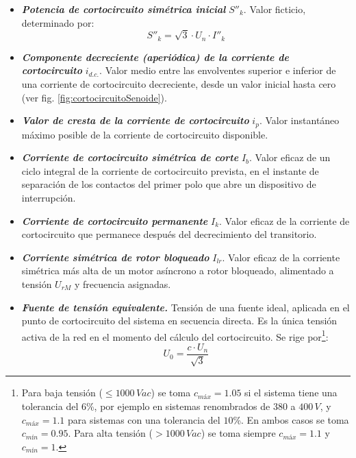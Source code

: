 \begin{itemize}
            \item \textbf{\textit{Potencia de cortocircuito simétrica inicial}} $S''_k$. Valor ficticio, determinado por:
            \begin{equation}
                S''_k = \sqrt{3}\cdot U_\textit{n} \cdot I''_k
            \end{equation}
            \item \textbf{\textit{Componente decreciente (aperiódica) de la corriente de cortocircuito}} $i_\textit{d.c.}$. Valor medio entre las envolventes superior e inferior de una corriente de cortocircuito decreciente, desde un valor inicial hasta cero (ver fig. \ref{fig:cortocircuitoSenoide}). 
            \item \textbf{\textit{Valor de cresta de la corriente de cortocircuito}} $i_\textit{p}$. Valor instantáneo máximo posible de la corriente de cortocircuito disponible.
            \item \textbf{\textit{Corriente de cortocircuito simétrica de corte}} $I_\textit{b}$. Valor eficaz de un ciclo integral de la corriente de cortocircuito prevista, en el instante de separación de los contactos del primer polo que abre un dispositivo de interrupción. 
            \item \textbf{\textit{Corriente de cortocircuito permanente}} $I_\textit{k}$. Valor eficaz de la corriente de cortocircuito que permanece después del decrecimiento del transitorio. 
            \item \textbf{\textit{Corriente simétrica de rotor bloqueado}} $I_\textit{lr}$. Valor eficaz de la corriente simétrica más alta de un motor asíncrono a rotor bloqueado, alimentado a tensión $U_\textit{rM}$ y frecuencia asignadas. 
            \item \textbf{\textit{Fuente de tensión equivalente.}} Tensión de una fuente ideal, aplicada en el punto de cortocircuito del sistema en secuencia directa. Es la única tensión activa de la red en el momento del cálculo del cortocircuito. Se rige por\footnote{Para baja tensión ($\leq 1000\,\textit{Vac}$) se toma $c_\textit{máx}=1.05$ si el sistema tiene una tolerancia del $6\!$\%, por ejemplo en sistemas renombrados de $380$ a $400\,\textit{V}$, y $c_\textit{máx}=1.1$ para sistemas con una tolerancia del $10\!$\%. En ambos casos se toma $c_\textit{mín}=0.95$. Para alta tensión ($>1000\,\textit{Vac}$) se toma siempre $c_\textit{máx}=1.1$ y $c_\textit{mín}=1$.}:
            \begin{equation}
                U_0 = \dfrac{c\cdot U_\textit{n}}{\sqrt{3}}

\end{equation}
\end{itemize}
